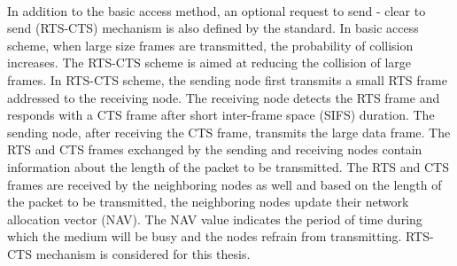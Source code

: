 \documentclass[12pt,letterpaper,english]{article}
\begin{document}
\\
\indent In addition to the basic access method, an optional request to send - clear to send (RTS-CTS) mechanism is also defined by the standard. In basic access scheme, when large size frames are transmitted, the probability of collision increases. The RTS-CTS scheme is aimed at reducing the collision of large frames. In RTS-CTS scheme, the sending node first transmits a small RTS frame addressed to the receiving node. The receiving node detects the RTS frame and responds with a CTS frame after short inter-frame space (SIFS) duration. The sending node, after receiving the CTS frame, transmits the large data frame. The RTS and CTS frames exchanged by the sending and receiving nodes contain information about the length of the packet to be transmitted. The RTS and CTS frames are received by the neighboring nodes as well and based on the length of the packet to be transmitted, the neighboring nodes update their network allocation vector (NAV). The NAV value indicates the period of time during which the medium will be busy and the nodes refrain from transmitting. RTS-CTS mechanism is considered for this thesis.
\end{document}

